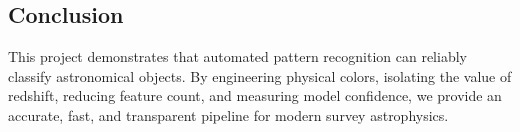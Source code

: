 \documentclass[11pt,a4paper]{article}
\begin{document}
\subsection{Conclusion}
This project demonstrates that automated pattern recognition can reliably classify astronomical objects. By engineering physical colors, isolating the value of redshift, reducing feature count, and measuring model confidence, we provide an accurate, fast, and transparent pipeline for modern survey astrophysics.
\end{document}
